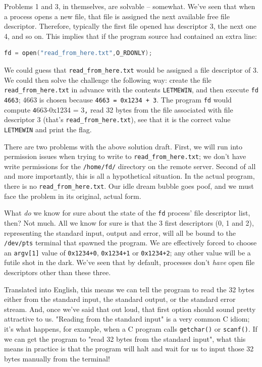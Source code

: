 \documentclass{article}
\newcommand{\xcode}[2]{\colorbox{ubuntuback}{\lstinline[language=#1]|#2|}}
\newcommand{\code}[1]{\colorbox{ubuntuback}{\texttt{#1}}}
\begin{document}
Problems 1 and 3, in themselves, are solvable -- somewhat. We've seen that when a process opens a new file, that file is assigned the next available free file descriptor. Therefore, typically the first file opened has descriptor 3, the next one 4, and so on. This implies that if the program source had contained an extra line: 

\begin{lstlisting}[language=C]
fd = open("read_from_here.txt",O_RDONLY);
\end{lstlisting}

We could guess that \code{read\_from\_here.txt} would be assigned a file descriptor of 3. We could then solve the challenge the following way: create the file \code{read\_from\_here.txt} in advance with the contents \code{LETMEWIN}, and then execute \code{fd 4663}; 4663 is chosen because \xcode{bash}{4663 = 0x1234 + 3}. The program \code{fd} would compute \xcode{bash}4663-0x1234 = 3\xcode{bash}, read 32 bytes from the file associated with file descriptor 3 (that's \code{read\_from\_here.txt}), see that it is the correct value \code{LETMEWIN} and print the flag.

There are two problems with the above solution draft. First, we will run into permission issues when trying to write to \code{read\_from\_here.txt}; we don't have write permissions for the \code{/home/fd/} directory on the remote server. Second of all and more importantly, this is all a hypothetical situation. In the actual program, there is no \code{read\_from\_here.txt}. Our idle dream bubble goes poof, and we must face the problem in its original, actual form.

What \textit{do} we know for sure about the state of the \code{fd} process' file descriptor list, then? Not much. All we know for sure is that the 3 first descriptors (0, 1 and 2), representing the standard input, output and error, will all be bound to the \code{/dev/pts} terminal that spawned the program. We are effectively forced to choose an \code{argv[1]} value of \code{0x1234+0}, \code{0x1234+1} or \code{0x1234+2}; any other value will be a futile shot in the dark. We've seen that by default, processes don't \textit{have} open file descriptors other than these three.

Translated into English, this means we can tell the program to read the 32 bytes either from the standard input, the standard output, or the standard error stream. And, once we've said that out loud, that first option should sound pretty attractive to us. "Reading from the standard input" is a very common C idiom; it's what happens, for example, when a C program calls \code{getchar()} or \code{scanf()}. If we can get the program to "read 32 bytes from the standard input", what this means in practice is that the program will halt and wait for us to input those 32 bytes manually from the terminal!
\end{document}
